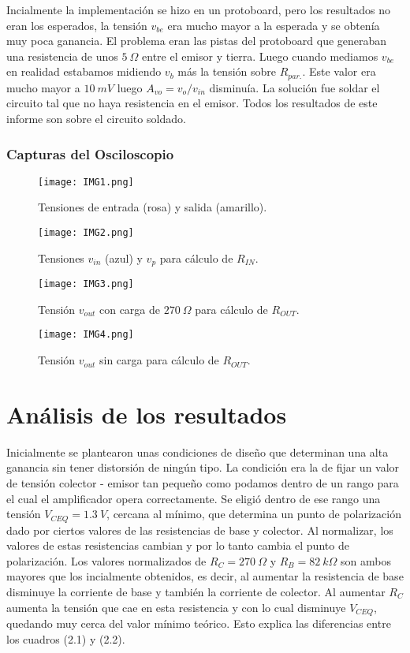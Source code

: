 \documentclass[a4paper, 10pt, spanish]{article}
\numberwithin{equation}{section}
\numberwithin{table}{section}
\begin{document}
Incialmente la implementación se hizo en un protoboard, pero los resultados no eran los esperados, la tensión $v_{be}$ era mucho mayor a la esperada y se obtenía muy poca ganancia. El problema eran las pistas del protoboard que generaban una resistencia de unos $5\ \Omega$ entre el emisor y tierra. Luego cuando mediamos $v_{be}$ en realidad estabamos midiendo $v_{b}$ más la tensión sobre $R_{par.}$. Este valor era mucho mayor a $10\ mV$ luego $A_{vo} = v_{o}/v_{in}$ disminuía. La solución fue soldar el circuito tal que no haya resistencia en el emisor. Todos los resultados de este informe son sobre el circuito soldado. 


\subsubsection{Capturas del Osciloscopio}
\begin{figure}[H]
    \centering
    \texttt{[image: IMG1.png]}
    \caption{Tensiones de entrada (rosa) y salida (amarillo).}
\end{figure}

\begin{figure}[H]
    \centering
    \texttt{[image: IMG2.png]}
    \caption{Tensiones $v_{in}$ (azul) y $v_p$ para cálculo de $R_{IN}.$}
\end{figure}

\begin{figure}[H]
    \centering
    \texttt{[image: IMG3.png]}
    \caption{Tensión $v_{out}$ con carga de $270\ \Omega$ para cálculo de $R_{OUT}.$}
\end{figure}

\begin{figure}[H]
    \centering
    \texttt{[image: IMG4.png]}
    \caption{Tensión $v_{out}$ sin carga para cálculo de $R_{OUT}.$}
\end{figure}


\newpage
\section{Análisis de los resultados}
Inicialmente se plantearon unas condiciones de diseño que determinan una alta ganancia sin tener distorsión de ningún tipo. La condición era la de fijar un valor de tensión colector - emisor tan pequeño como podamos dentro de un rango para el cual el amplificador opera correctamente. Se eligió dentro de ese rango una tensión $V_{CEQ} = 1.3\ V$, cercana al mínimo, que determina un punto de polarización dado por ciertos valores de las resistencias de base y colector. Al normalizar, los valores de estas resistencias cambian y por lo tanto cambia el punto de polarización. Los valores normalizados de $R_C = 270\ \Omega$ y $R_B = 82\ k\Omega$ son ambos mayores que los incialmente obtenidos, es decir, al aumentar la resistencia de base disminuye la corriente de base y también la corriente de colector. Al aumentar $R_C$ aumenta la tensión que cae en esta resistencia y con lo cual disminuye $V_{CEQ}$, quedando muy cerca del valor mínimo teórico. Esto explica las diferencias entre los cuadros (2.1) y (2.2). 
\end{document}
